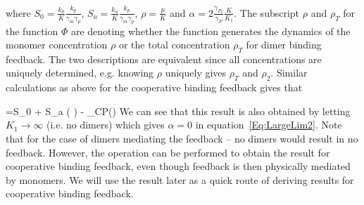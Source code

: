 \documentclass[notitlepage,dvips,rmp,fleqn,superscriptaddress,floatfix]{revtex4-1}
\newcounter{Sequ}
\newenvironment{SEqn}
  {\stepcounter{Sequ}%
    \addtocounter{equation}{-1}%
    \renewcommand\theequation{S\arabic{Sequ}}\equation}
  {\endequation}
\begin{document}
%
where $S_0= \frac{k_0}{K} \frac{k_p}{\gamma_m \gamma_p}  $, $S_a=\frac{k_a}{K}  \frac{k_p}{\gamma_m \gamma_p}  $, ${\rho}=\frac{p}{K }$ and  $\alpha=2 \frac{\gamma_{P_2}}{\gamma_{P}} \frac{K}{K_1}$. The subscript $\rho$ and $\rho_T$ for the function $\Phi$ are denoting whether the function generates the dynamics of the monomer concentration $\rho$ or the total concentration $\rho_T$ for dimer binding feedback. The two descriptions are equivalent since all concentrations are uniquely determined, e.g. knowing $\rho$ uniquely gives $\rho_T$ and $\rho_2$. Similar calculations as above for the cooperative binding feedback gives that
%
\begin{SEqn}
=S_0 + S_a \left( \right) - \rho\equiv \Phi_{\textnormal{CP}}(\rho)
\label{Eq:LargeLimCp}
\end{SEqn}
%
We can see that this result is also obtained by letting $K_1\to \infty$ (i.e. no dimers) which gives $\alpha=0$ in equation~\ref{Eq:LargeLim2}. Note that for the case of dimers mediating the feedback \--- no dimers would result in no feedback. However, the operation can be performed to obtain the result for cooperative binding feedback, even though feedback is then physically mediated by monomers. We will use the result later as a quick route of deriving results for cooperative binding feedback.
\end{document}
